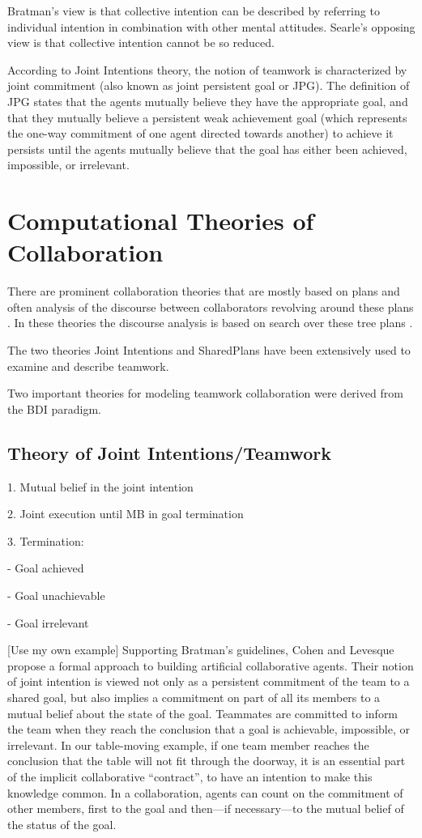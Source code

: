 \documentclass[11pt]{article}
\begin{document}
Bratman's view is that collective intention can be described by referring to
individual intention in combination with other mental attitudes. Searle's
opposing view is that collective intention cannot be so reduced.

According to Joint Intentions theory, the notion of teamwork is characterized by
joint commitment (also known as joint persistent goal or JPG). The definition of
JPG states that the agents mutually believe they have the appropriate goal, and
that they mutually believe a persistent weak achievement goal (which represents
the one-way commitment of one agent directed towards another) to achieve it
persists until the agents mutually believe that the goal has either been
achieved, impossible, or irrelevant.

\section{Computational Theories of Collaboration}

There are prominent collaboration theories that are mostly based on plans and
often analysis of the discourse between collaborators revolving around these
plans \cite{grosz:plans-discourse, Litman:discourse-commonsense}. In these
theories the discourse analysis is based on search over these tree plans
\cite{rich:discourse}.

The two theories Joint Intentions and SharedPlans have been extensively used to
examine and describe teamwork.

Two important theories for modeling teamwork collaboration were derived from
the BDI paradigm.

\subsection{Theory of Joint Intentions/Teamwork}

1. Mutual belief in the joint intention

2. Joint execution until MB in goal termination

3. Termination:

- Goal achieved

- Goal unachievable

- Goal irrelevant

[Use my own example] Supporting Bratman’s guidelines, Cohen and Levesque propose
a formal approach to building artificial collaborative agents. Their notion of
joint intention is viewed not only as a persistent commitment of the team to a
shared goal, but also implies a commitment on part of all its members to a
mutual belief about the state of the goal. Teammates are committed to inform the
team when they reach the conclusion that a goal is achievable, impossible, or
irrelevant. In our table-moving example, if one team member reaches the
conclusion that the table will not fit through the doorway, it is an essential
part of the implicit collaborative “contract”, to have an intention to make this
knowledge common. In a collaboration, agents can count on the commitment of
other members, first to the goal and then—if necessary—to the mutual belief of
the status of the goal.
\end{document}
